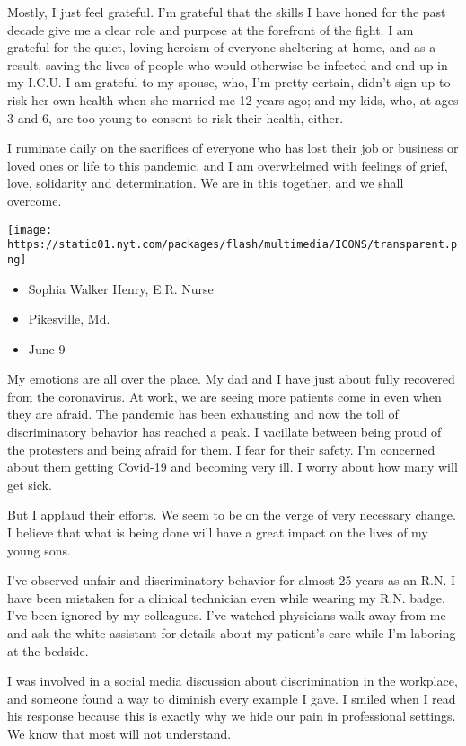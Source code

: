 Mostly, I just feel grateful. I'm grateful that the skills I have honed
for the past decade give me a clear role and purpose at the forefront of
the fight. I am grateful for the quiet, loving heroism of everyone
sheltering at home, and as a result, saving the lives of people who
would otherwise be infected and end up in my I.C.U. I am grateful to my
spouse, who, I'm pretty certain, didn't sign up to risk her own health
when she married me 12 years ago; and my kids, who, at ages 3 and 6, are
too young to consent to risk their health, either.

I ruminate daily on the sacrifices of everyone who has lost their job or
business or loved ones or life to this pandemic, and I am overwhelmed
with feelings of grief, love, solidarity and determination. We are in
this together, and we shall overcome.

\texttt{[image: https://static01.nyt.com/packages/flash/multimedia/ICONS/transparent.png]}

\begin{itemize}
\tightlist
\item
  Sophia Walker Henry, E.R. Nurse
\item
  Pikesville, Md.
\item
  June 9
\end{itemize}

My emotions are all over the place. My dad and I have just about fully
recovered from the coronavirus. At work, we are seeing more patients
come in even when they are afraid. The pandemic has been exhausting and
now the toll of discriminatory behavior has reached a peak. I vacillate
between being proud of the protesters and being afraid for them. I fear
for their safety. I'm concerned about them getting Covid-19 and becoming
very ill. I worry about how many will get sick.

But I applaud their efforts. We seem to be on the verge of very
necessary change. I believe that what is being done will have a great
impact on the lives of my young sons.

I've observed unfair and discriminatory behavior for almost 25 years as
an R.N. I have been mistaken for a clinical technician even while
wearing my R.N. badge. I've been ignored by my colleagues. I've watched
physicians walk away from me and ask the white assistant for details
about my patient's care while I'm laboring at the bedside.

I was involved in a social media discussion about discrimination in the
workplace, and someone found a way to diminish every example I gave. I
smiled when I read his response because this is exactly why we hide our
pain in professional settings. We know that most will not understand.

